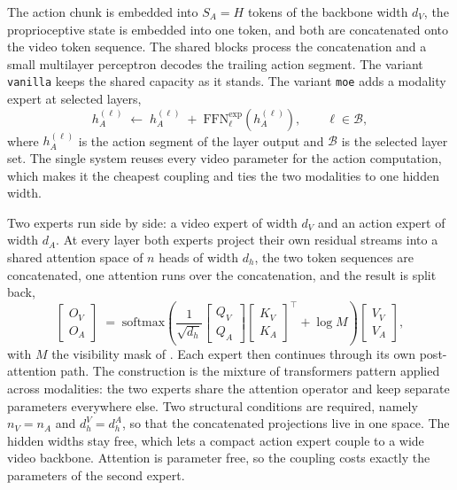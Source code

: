 The action chunk is embedded into $S_A = H$ tokens of the backbone width $d_V$,
the proprioceptive state is embedded into one token, and both are concatenated
onto the video token sequence. The shared blocks process the concatenation and a
small multilayer perceptron decodes the trailing action segment. The variant
\texttt{vanilla} keeps the shared capacity as it stands. The variant \texttt{moe} adds a
modality expert at selected layers,
\begin{equation}
  h_A^{(\ell)} \;\leftarrow\; h_A^{(\ell)} \;+\; \mathrm{FFN}^{\text{exp}}_\ell\!\left(h_A^{(\ell)}\right),
  \qquad \ell \in \mathcal{B},
  \label{eq:moe}
\end{equation}
where $h_A^{(\ell)}$ is the action segment of the layer output and $\mathcal{B}$
is the selected layer set. The single system reuses every video parameter for the
action computation, which makes it the cheapest coupling and ties the two
modalities to one hidden width.

Two experts run side by side: a video expert of width $d_V$ and an action expert
of width $d_A$. At every layer both experts project their own residual streams
into a shared attention space of $n$ heads of width $d_h$, the two token
sequences are concatenated, one attention runs over the concatenation, and the
result is split back,
\begin{equation}
  \begin{bmatrix} O_V \\ O_A \end{bmatrix}
  \;=\;
  \mathrm{softmax}\!\left(
    \frac{1}{\sqrt{d_h}}
    \begin{bmatrix} Q_V \\ Q_A \end{bmatrix}
    \begin{bmatrix} K_V \\ K_A \end{bmatrix}^{\!\top}
    + \log M
  \right)
  \begin{bmatrix} V_V \\ V_A \end{bmatrix},
  \label{eq:mot}
\end{equation}
with $M$ the visibility mask of . Each expert then continues
through its own post-attention path. The construction is the mixture of
transformers pattern \citep{liang2024mot} applied across modalities: the two
experts share the attention operator and keep separate parameters everywhere
else. Two structural conditions are required, namely $n_V = n_A$ and
$d_h^V = d_h^A$, so that the concatenated projections live in one space. The
hidden widths stay free, which lets a compact action expert couple to a wide
video backbone. Attention is parameter free, so the coupling costs exactly the parameters of the
second expert.

